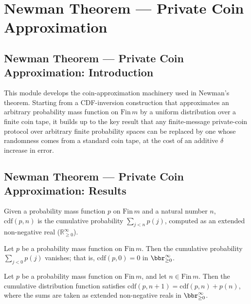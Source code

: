 \section{Newman Theorem --- Private Coin Approximation}
\subsection*{Newman Theorem --- Private Coin Approximation: Introduction}

This module develops the coin-approximation machinery used in Newman's theorem.
Starting from a CDF-inversion construction that approximates an arbitrary probability
mass function on $\mathrm{Fin}\,m$ by a uniform distribution over a finite coin tape,
it builds up to the key result that any finite-message private-coin protocol over
arbitrary finite probability spaces can be replaced by one whose randomness comes from
a standard coin tape, at the cost of an additive $\delta$ increase in error.

\subsection*{Newman Theorem --- Private Coin Approximation: Results}

\begin{definition}
\label{CommunicationComplexity.Internal.cdf}
\leanok
Given a probability mass function $p$ on $\mathrm{Fin}\,m$ and a natural number $n$,
$\mathrm{cdf}(p, n)$ is the cumulative probability $\sum_{j < n} p(j)$, computed as an
extended non-negative real ($\mathbb{R}_{\ge 0}^\infty$).
\end{definition}

\begin{lemma}
\label{CommunicationComplexity.Internal.cdf_zero}
\leanok
{}
Let $p$ be a probability mass function on $\mathrm{Fin}\,m$. Then the cumulative
probability $\sum_{j < 0} p(j)$ vanishes; that is, $\mathrm{cdf}(p, 0) = 0$ in
$\bbr_{\ge 0}^\infty$.
\end{lemma}

\begin{lemma}
\label{CommunicationComplexity.Internal.cdf_succ}
\leanok
{}
Let $p$ be a probability mass function on $\mathrm{Fin}\,m$, and let $n \in
\mathrm{Fin}\,m$. Then the cumulative distribution function satisfies $\mathrm{cdf}(p,
n+1) = \mathrm{cdf}(p, n) + p(n)$, where the sums are taken as extended non-negative
reals in $\bbr_{\ge 0}^\infty$.
\end{lemma}

